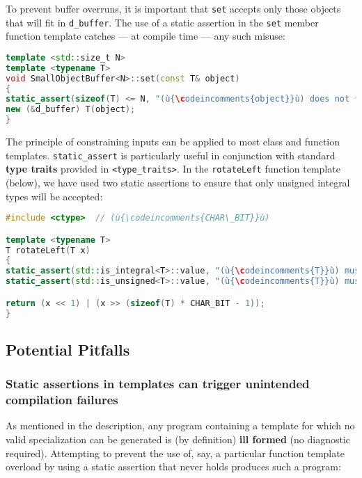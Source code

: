 \noindent To prevent buffer overruns, it is important that \texttt{set} accepts
only those objects that will fit in \texttt{d\_buffer}. The use of a
static assertion in the \texttt{set} member function template catches
--- at compile time --- any such misuse:

\begin{lstlisting}[language=C++]
template <std::size_t N>
template <typename T>
void SmallObjectBuffer<N>::set(const T& object)
{
static_assert(sizeof(T) <= N, "(ù{\codeincomments{object}}ù) does not fit in the small buffer.");
new (&d_buffer) T(object);
}
\end{lstlisting}


The principle of constraining inputs can be applied to most class and
function templates. \texttt{static\_assert} is particularly useful in
conjunction with standard \textbf{type traits} provided in
\texttt{<type\_traits>}. In the \texttt{rotateLeft} function template
(below), we have used two static assertions to ensure that only unsigned
integral types will be accepted:

\begin{lstlisting}[language=C++]
#include <ctype>  // (ù{\codeincomments{CHAR\_BIT}}ù)

template <typename T>
T rotateLeft(T x)
{
static_assert(std::is_integral<T>::value, "(ù{\codeincomments{T}}ù) must be an integral type.");
static_assert(std::is_unsigned<T>::value, "(ù{\codeincomments{T}}ù) must be an unsigned type.");

return (x << 1) | (x >> (sizeof(T) * CHAR_BIT - 1));
}
\end{lstlisting}


\subsection[Potential Pitfalls]{Potential Pitfalls}\label{static-potential-pitfalls}

\subsubsection[Static assertions in templates can trigger unintended compilation failures]{Static assertions in templates can trigger unintended compilation failures}\label{static-assertions-in-templates-can-trigger-unintended-compilation-failures}

As mentioned in the description, any program containing a template for
which no valid specialization can be generated is (by definition)
\textbf{ill formed} (no diagnostic required). Attempting to prevent the
use of, say, a particular function template overload by using a static
assertion that never holds produces such a program:

